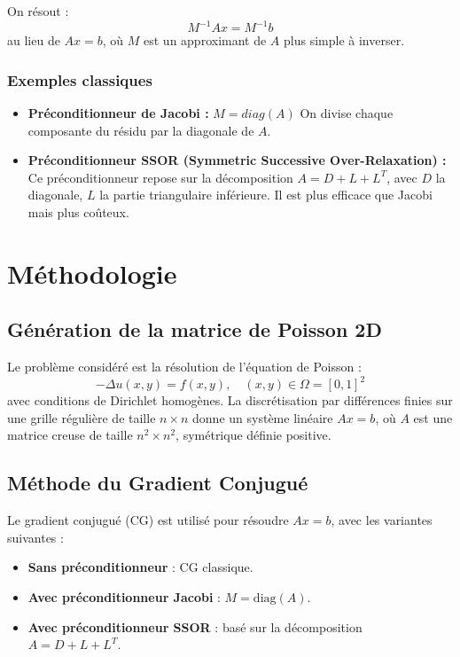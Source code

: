 \documentclass[12pt,a4paper]{article}
\begin{document}
	On résout :
	\[
	M^{-1} A x = M^{-1} b
	\]
	au lieu de $Ax = b$, où $M$ est un approximant de $A$ plus simple à inverser.
	
	\subsubsection*{Exemples classiques}
	
	\begin{itemize}
		\item \textbf{Préconditionneur de Jacobi :}
		$
		M = diag(A)
		$
		On divise chaque composante du résidu par la diagonale de $A$.
		\item \textbf{Préconditionneur SSOR (Symmetric Successive Over-Relaxation) :} 
		Ce préconditionneur repose sur la décomposition $A = D + L + L^T$, avec $D$ la diagonale, $L$ la partie triangulaire inférieure. Il est plus efficace que Jacobi mais plus coûteux.
	\end{itemize}
	
    \newpage
	\section{Méthodologie}

    \subsection{Génération de la matrice de Poisson 2D}
    Le problème considéré est la résolution de l'équation de Poisson :
    \[
    -\Delta u(x, y) = f(x, y), \quad (x, y) \in \Omega = [0,1]^2
    \]
    avec conditions de Dirichlet homogènes. La discrétisation par différences finies sur une grille régulière de taille $n \times n$ donne un système linéaire $Ax = b$, où $A$ est une matrice creuse de taille $n^2 \times n^2$, symétrique définie positive.

    \subsection{Méthode du Gradient Conjugué}
    Le gradient conjugué (CG) est utilisé pour résoudre $Ax = b$, avec les variantes suivantes :

    \begin{itemize}
        \item \textbf{Sans préconditionneur} : CG classique.
        \item \textbf{Avec préconditionneur Jacobi} : $M = \text{diag}(A)$.
        \item \textbf{Avec préconditionneur SSOR} : basé sur la décomposition $A = D + L + L^T$.
    \end{itemize}
\end{document}
